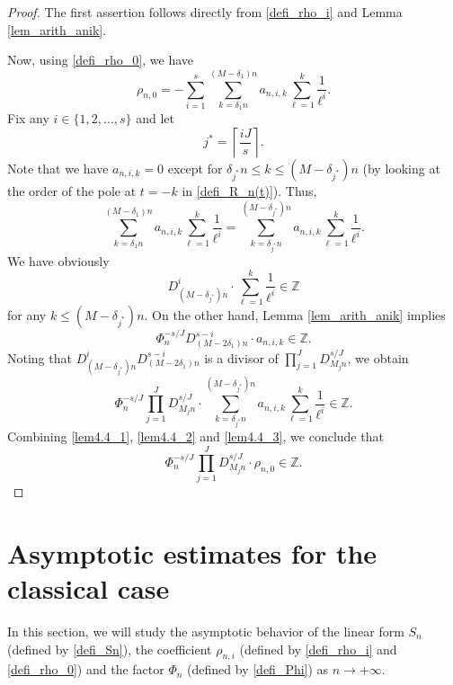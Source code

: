 \documentclass[12pt]{article}
\numberwithin{equation}{section}
\begin{document}
\begin{proof}
The first assertion follows directly from \eqref{defi_rho_i} and Lemma \ref{lem_arith_anik}. 

Now, using \eqref{defi_rho_0}, we have
\begin{equation}\label{lem4.4_1}
\rho_{n,0} = -\sum_{i=1}^{s}\sum_{k=\delta_1n}^{(M-\delta_1)n} a_{n,i,k} \sum_{\ell=1}^{k} \frac{1}{\ell^i}. 
\end{equation}
Fix any $i \in \{1,2,\ldots,s\}$ and let 
\[ j^{*} = \left\lceil  \frac{iJ}{s} \right\rceil. \] 
Note that we have $a_{n,i,k} = 0$ except for $ \delta_{j^{*}}n \leqslant k \leqslant (M-\delta_{j^{*}})n$ (by looking at the order of the pole at $t=-k$ in \eqref{defi_R_n(t)}). Thus,
\begin{equation}\label{lem4.4_2}
\sum_{k=\delta_1n}^{(M-\delta_1)n} a_{n,i,k} \sum_{\ell=1}^{k} \frac{1}{\ell^i} = \sum_{k=\delta_{j^{*}}n}^{(M-\delta_{j^{*}})n} a_{n,i,k} \sum_{\ell=1}^{k} \frac{1}{\ell^i}. 
\end{equation}
We have obviously  
\[  D_{(M-\delta_{j^{*}})n}^{i} \cdot  \sum_{\ell=1}^{k} \frac{1}{\ell^{i}} \in \mathbb{Z} \]
for any $k \leqslant (M-\delta_{j^{*}})n$. On the other hand, Lemma \ref{lem_arith_anik} implies
\[ \Phi_n^{-s/J} D_{(M-2\delta_1)n}^{s-i} \cdot a_{n,i,k} \in \mathbb{Z}. \]
Noting that $D_{(M-\delta_{j^{*}})n}^{i}  D_{(M-2\delta_1)n}^{s-i}$ is a divisor of $\prod_{j=1}^{J} D_{M_jn}^{s/J}$, we obtain
\begin{equation}\label{lem4.4_3}
\Phi_n^{-s/J} \prod_{j=1}^{J} D_{M_jn}^{s/J} \cdot \sum_{k=\delta_{j^{*}}n}^{(M-\delta_{j^{*}})n} a_{n,i,k} \sum_{\ell=1}^{k} \frac{1}{\ell^i} \in \mathbb{Z}. 
\end{equation}
Combining \eqref{lem4.4_1}, \eqref{lem4.4_2} and \eqref{lem4.4_3}, we conclude that
\[ \Phi_n^{-s/J} \prod_{j=1}^{J} D_{M_jn}^{s/J} \cdot \rho_{n,0} \in \mathbb{Z}. \]
\end{proof}


\bigskip

\section{Asymptotic estimates for the classical case}\label{Sect_asym}
In this section, we will study the asymptotic behavior of the linear form $S_n$ (defined by \eqref{defi_Sn}), the coefficient $\rho_{n,i}$ (defined by \eqref{defi_rho_i} and \eqref{defi_rho_0}) and the factor $\Phi_n$ (defined by \eqref{defi_Phi}) as $n \to +\infty$. 
\end{document}
